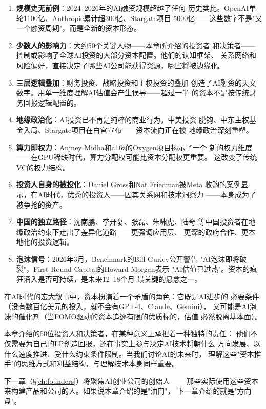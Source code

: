 \begin{corebox}[本章核心要点总结]
\begin{enumerate}
  \item \textbf{规模史无前例}：2024--2026年的AI融资规模超越了任何
    历史类比。OpenAI单轮1100亿、Anthropic累计超300亿、Stargate项目
    5000亿——这些数字不是"又一个融资周期"，而是全新的资本形态。

  \item \textbf{少数人的影响力}：大约50个关键人物——本章所介绍的投资者
    和决策者——控制或影响了全球AI投资的大部分资本配置。他们的认知框架、
    关系网络和风险偏好，直接决定了哪些AI公司能获得资源，哪些将被边缘化。

  \item \textbf{三层逻辑叠加}：财务投资、战略投资和主权投资的叠加
    创造了AI融资的天文数字。用单一维度理解AI估值会产生误导——超过一半
    的资本不是按传统财务回报逻辑配置的。

  \item \textbf{地缘政治化}：AI投资已不再是纯粹的商业行为。中美投资
    脱钩、中东主权基金入局、Stargate项目在白宫宣布——资本流向正在被
    地缘政治深刻重塑。

  \item \textbf{算力即权力}：Anjney Midha和a16z的Oxygen项目揭示了一个
    新的权力维度——在GPU稀缺时代，算力分配权可能比资本分配权更重要。
    这改变了传统VC的权力结构。

  \item \textbf{投资人自身的被投化}：Daniel Gross和Nat Friedman被Meta
    收购的案例显示，在AI时代，优秀的投资人——因其关系网和技术洞察力
    ——本身成为了被争抢的资产。

  \item \textbf{中国的独立路径}：沈南鹏、李开复、张磊、朱啸虎、陆奇
    等中国投资者在地缘政治约束下走出了差异化道路——更强调应用层、
    更深的政府合作、更本地化的投资逻辑。

  \item \textbf{泡沫信号}：2026年3月，Benchmark的Bill Gurley公开警告
    "AI泡沫即将破裂"，First Round Capital的Howard Morgan表示
    "AI估值已过热"。资本的疯狂涌入是否可持续，是未来12--18个月
    最关键的悬念之一。
\end{enumerate}
\end{corebox}

在AI时代的宏大叙事中，资本扮演着一个矛盾的角色：它既是AI进步的
必要条件（没有数百亿美元的投入，就不会有GPT-4、Claude、Gemini），
又可能是AI泡沫的催化剂（当FOMO驱动的资本追逐有限的优质标的，估值
必然脱离基本面）。

本章介绍的50位投资人和决策者，在某种意义上承担着一种独特的责任：
他们不仅需要为自己的LP创造回报，还在事实上参与决定AI技术将朝什么
方向发展、以什么速度推进、受什么约束条件限制。当我们讨论AI的未来时，
理解这些"资本推手"的思维方式和利益结构，与理解技术本身同样重要。

下一章（\S\ref{ch:founders}）将聚焦AI创业公司的创始人——
那些实际使用这些资本来构建产品和公司的人。如果说本章介绍的是"油门"，
下一章介绍的就是"方向盘"。
